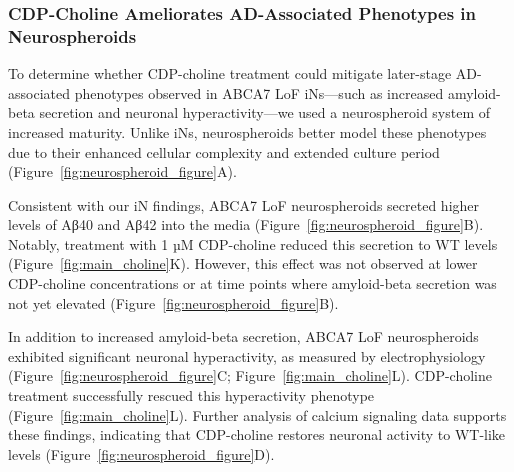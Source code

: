 \subsubsection{CDP-Choline Ameliorates AD-Associated Phenotypes in Neurospheroids}
To determine whether CDP-choline treatment could mitigate later-stage AD-associated phenotypes observed in ABCA7 LoF iNs—such as increased amyloid-beta secretion and neuronal hyperactivity—we used a neurospheroid system of increased maturity. Unlike iNs, neurospheroids better model these phenotypes due to their enhanced cellular complexity and extended culture period (Figure~\ref{fig:neurospheroid_figure}A).

Consistent with our iN findings, ABCA7 LoF neurospheroids secreted higher levels of Aβ40 and Aβ42 into the media (Figure~\ref{fig:neurospheroid_figure}B). Notably, treatment with 1 µM CDP-choline reduced this secretion to WT levels (Figure~\ref{fig:main_choline}K). However, this effect was not observed at lower CDP-choline concentrations or at time points where amyloid-beta secretion was not yet elevated (Figure~\ref{fig:neurospheroid_figure}B).

In addition to increased amyloid-beta secretion, ABCA7 LoF neurospheroids exhibited significant neuronal hyperactivity, as measured by electrophysiology (Figure~\ref{fig:neurospheroid_figure}C; Figure~\ref{fig:main_choline}L). CDP-choline treatment successfully rescued this hyperactivity phenotype (Figure~\ref{fig:main_choline}L). Further analysis of calcium signaling data supports these findings, indicating that CDP-choline restores neuronal activity to WT-like levels (Figure~\ref{fig:neurospheroid_figure}D).

